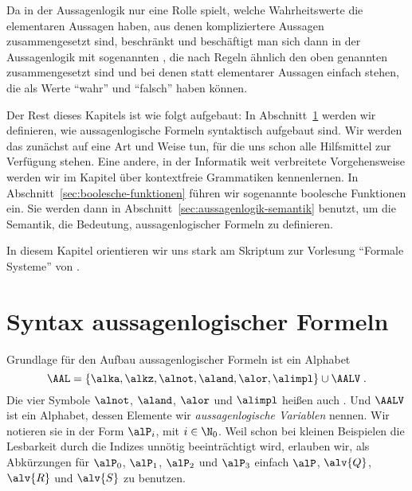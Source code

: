 \noindent
Da in der Aussagenlogik nur eine Rolle spielt, welche Wahrheitswerte
die elementaren Aussagen haben, aus denen kompliziertere Aussagen
zusammengesetzt sind, beschränkt und beschäftigt man sich dann in der
Aussagenlogik mit sogenannten
, die nach Regeln ähnlich den
oben genannten zusammengesetzt sind und bei denen statt elementarer
Aussagen einfach 
stehen, die als Werte "`wahr"' und "`falsch"' haben können.

Der Rest dieses Kapitels ist wie folgt aufgebaut:
%
In Abschnitt~\ref{sec:aussagenlogik-syntax} werden wir definieren, wie
aussagenlogische Formeln syntaktisch aufgebaut sind.
%
%
Wir werden das zunächst auf eine Art und Weise tun, für die uns schon
alle Hilfsmittel zur Verfügung stehen.
%
Eine andere, in der Informatik weit verbreitete Vorgehensweise werden
wir im Kapitel über kontextfreie Grammatiken kennenlernen.
%
In Abschnitt~\ref{sec:boolesche-funktionen} führen wir sogenannte
boolesche Funktionen ein.
%
Sie werden dann in Abschnitt~\ref{sec:aussagenlogik-semantik} benutzt,
um die Semantik, \dh die Bedeutung, aussagenlogischer Formeln zu
definieren.

In diesem Kapitel orientieren wir uns stark am Skriptum zur Vorlesung
"`Formale Systeme"' von \textcite{Schmitt_2013_FS_tr}.

\section{Syntax aussagenlogischer Formeln}
\label{sec:aussagenlogik-syntax}

Grundlage für den Aufbau aussagenlogischer Formeln ist ein Alphabet
\[
  \AAL = \{ \alka, \alkz, \alnot, \aland, \alor, \alimpl \} \cup \AALV \;.
\]
%
Die vier Symbole $\alnot$, $\aland$, $\alor$ und $\alimpl$ heißen auch
%
.
%
Und $\AALV$ ist ein Alphabet, dessen Elemente wir
\emph{aussagenlogische Variablen} nennen.
%
Wir notieren sie in der Form $\alP_i$, mit $i\in\N_0$.
%
Weil schon bei kleinen Beispielen die Lesbarkeit durch die Indizes
unnötig beeinträchtigt wird, erlauben wir, als Abkürzungen für
$\alP_0$,
$\alP_1$,
$\alP_2$
und $\alP_3$
einfach $\alP$, $\alv{Q}$, $\alv{R}$ und $\alv{S}$ zu benutzen.


